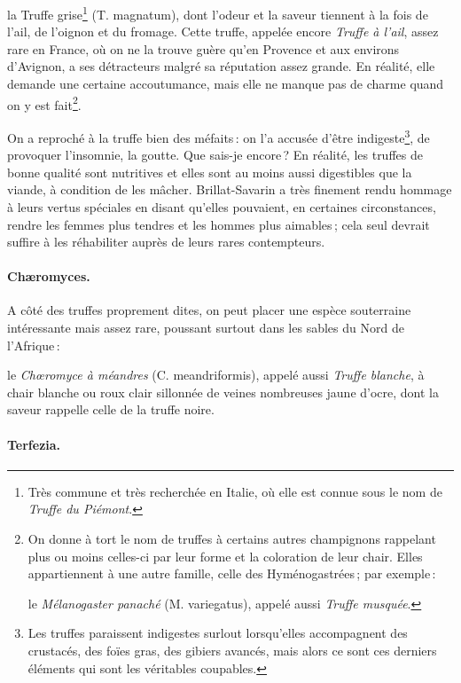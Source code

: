 la Truffe grise\footnote{Très commune et très recherchée en Italie, où elle est
connue sous le nom de \textit{Truffe du Piémont}.} (T. magnatum), dont l'odeur
et la saveur tiennent à la fois de l'ail, de l'oignon et du fromage. Cette
truffe, appelée encore \textit{Truffe à l'ail}, assez rare en France, où on ne
la trouve guère qu'en Provence et aux environs d'Avignon, a ses détracteurs
malgré sa réputation assez grande. En réalité, elle demande une certaine
accoutumance, mais elle ne manque pas de charme quand on y est fait\footnote{On
donne à tort le nom de truffes à certains autres champignons rappelant plus ou
moins celles-ci par leur forme et la coloration de leur chair. Elles
appartiennent à une autre famille, celle des Hyménogastrées ; par exemple :

le \textit{Mélanogaster panaché} (M. variegatus), appelé aussi \textit{Truffe
musquée}.}.

\medskip

On a reproché à la truffe bien des méfaits : on l'a accusée d'être
indigeste\footnote{Les truffes paraissent indigestes surlout lorsqu'elles
accompagnent des crustacés, des foïes gras, des gibiers avancés, mais alors ce
sont ces derniers éléments qui sont les véritables coupables.}, de provoquer
l'insomnie, la goutte. Que sais-je encore ? En réalité, les truffes de bonne
qualité sont nutritives et elles sont au moins aussi digestibles que la viande,
à condition de les mâcher. Brillat-Savarin a très finement rendu hommage
à leurs vertus spéciales en disant qu'elles pouvaient, en certaines
circonstances, rendre les femmes plus tendres et les hommes plus aimables ;
cela seul devrait suffire à les réhabiliter auprès de leurs rares contempteurs.

\paragraph{Chæromyces.}

A côté des truffes proprement dites, on peut placer une espèce souterraine
intéressante mais assez rare, poussant surtout dans les sables du Nord de
l'Afrique :

le \textit{Chœromyce à méandres} (C. meandriformis), appelé aussi \textit{Truffe
blanche}, à chair blanche ou roux clair sillonnée de veines nombreuses jaune
d’ocre, dont la saveur rappelle celle de la truffe noire.

\paragraph{Terfezia.}

